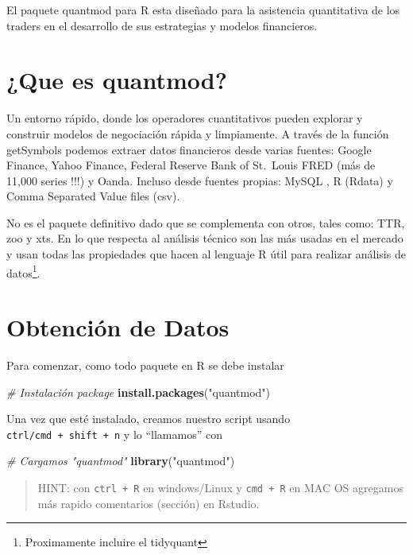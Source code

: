\documentclass[12pt,]{book}
\newenvironment{Shaded}{\begin{snugshade}}{\end{snugshade}}
\newcommand{\KeywordTok}[1]{\textcolor[rgb]{0.13,0.29,0.53}{\textbf{#1}}}
\newcommand{\StringTok}[1]{\textcolor[rgb]{0.31,0.60,0.02}{#1}}
\newcommand{\CommentTok}[1]{\textcolor[rgb]{0.56,0.35,0.01}{\textit{#1}}}
\newcommand{\NormalTok}[1]{#1}
\begin{document}
El paquete quantmod para R esta diseñado para la asistencia quantitativa
de los traders en el desarrollo de sus estrategias y modelos
financieros.

\section{¿Que es quantmod?}\label{que-es-quantmod}

Un entorno rápido, donde los operadores cuantitativos pueden explorar y
construir modelos de negociación rápida y limpiamente. A través de la
función getSymbols podemos extraer datos financieros desde varias
fuentes: Google Finance, Yahoo Finance, Federal Reserve Bank of
St.~Louis FRED (más de 11,000 series !!!) y Oanda. Incluso desde fuentes
propias: MySQL , R (Rdata) y Comma Separated Value files (csv).

No es el paquete definitivo dado que se complementa con otros, tales
como: TTR, zoo y xts. En lo que respecta al análisis técnico son las más
usadas en el mercado y usan todas las propiedades que hacen al lenguaje
R útil para realizar análisis de datos\footnote{Proximamente incluire el
  tidyquant}.

\section{Obtención de Datos}\label{obtencion-de-datos}

Para comenzar, como todo paquete en R se debe instalar

\begin{Shaded}
\begin{Highlighting}[]
\CommentTok{# Instalación package}
\KeywordTok{install.packages}\NormalTok{(}\StringTok{"quantmod"}\NormalTok{)}
\end{Highlighting}
\end{Shaded}

Una vez que esté instalado, creamos nuestro script usando
\texttt{ctrl/cmd\ +\ shift\ +\ n} y lo ``llamamos'' con

\begin{Shaded}
\begin{Highlighting}[]
\CommentTok{# Cargamos "quantmod"}
\KeywordTok{library}\NormalTok{(}\StringTok{"quantmod"}\NormalTok{)}
\end{Highlighting}
\end{Shaded}

\begin{quote}
HINT: con \texttt{ctrl\ +\ R} en windows/Linux y \texttt{cmd\ +\ R} en
MAC OS agregamos más rapido comentarios (sección) en Rstudio.
\end{quote}
\end{document}
